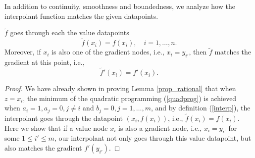 In addition to continuity, smoothness and boundedness, we analyze how the
interpolant function matches the given datapoints.
\begin{proposition} \label{prop_match}
$\tilde f$ goes through each the value datapoints
\[ {\tilde f}(x_i) = f(x_i), \quad i = 1,\ldots,n . \]
Moreover, if $x_i$ is also one of the gradient nodes, i.e.,
$x_i = y_{i'}$, then $\tilde f$ matches the gradient at this point, i.e.,
\[ {\tilde f}'(x_i) = f'(x_i). \]
\end{proposition}
\begin{proof}
We have already shown in proving Lemma \ref{prop_rational} that when $z=x_i$,
the minimum of the quadratic programming (\ref{quadprog}) is achieved when
$a_i = 1, a_j = 0, j\ne i$ and $b_j = 0, j=1,\ldots,m$, and by definition
(\ref{interp}), the interpolant goes through the datapoint $(x_i, f(x_i))$,
i.e., ${\tilde f}(x_i) = f(x_i)$.  Here we show that if a value node
$x_i$ is also a gradient node, i.e., $x_i=y_{i'}$ for some $1\le i'\le m$,
our interpolant not only goes through this value datapoint, but also matches
the gradient $f'(y_{i'})$.


\end{proof}
